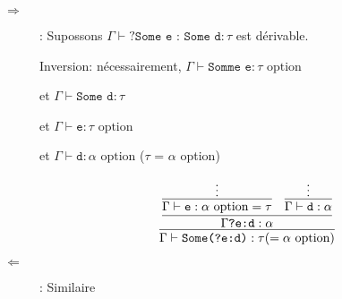 \documentclass{article}
\theoremstyle{plain}
\begin{document}
\begin{enumerate}
  \begin{description}
    \item[$\Rightarrow$]: Supossons $\Gamma \vdash \texttt{?Some e : Some d} : \tau$  
      est dérivable.

      Inversion: nécessairement, $\Gamma \vdash \texttt{Somme e} : \tau \text{ option}$

      et $\Gamma \vdash \texttt{Some d} : \tau$

      et $\Gamma \vdash \texttt{e} : \tau \text{ option}$

      et $\Gamma \vdash \texttt{d} : \alpha \text{ option} $ ($\tau$ = $\alpha$ option)

      \[
        \infer{\Gamma \vdash \texttt{Some(?e:d)} : \tau (= \alpha \text{ option})}
          {\infer{\Gamma \texttt{?e:d} : \alpha}{
            \infer{\Gamma \vdash \texttt{e} : \alpha \text{ option} = \tau}{\vdots}
            &
            \infer{\Gamma \vdash \texttt{d} : \alpha}{\vdots}
          }}
      \]

    \item[$\Leftarrow$]: Similaire
  \end{description}
\end{enumerate}
\end{document}
